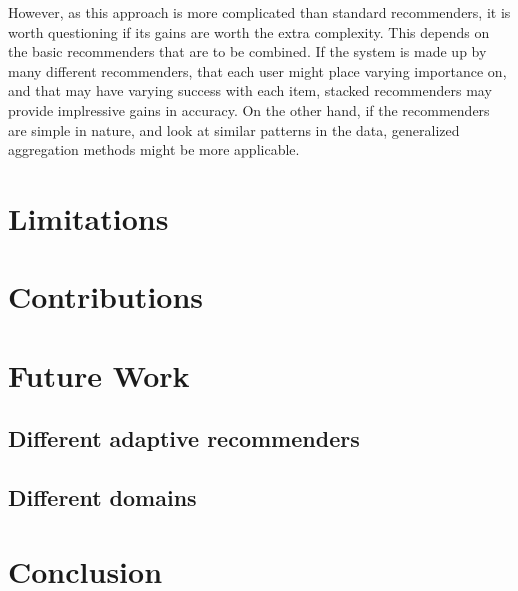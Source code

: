 However, as this approach is more complicated than standard recommenders,
it is worth questioning if its gains are worth the extra complexity.
This depends on the basic recommenders that are to be combined.
If the system is made up by many different recommenders,
that each user might place varying importance on,
and that may have varying success with each item,
stacked recommenders may provide implressive gains in accuracy.
On the other hand, if the recommenders are simple in nature,
and look at similar patterns in the data,
generalized aggregation methods might be more applicable.





\section{Limitations}


\section{Contributions} 


\section{Future Work}      

\subsection{Different adaptive recommenders}
\subsection{Different domains}


\section{Conclusion}      


